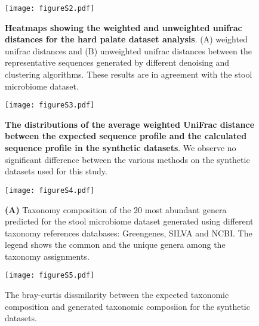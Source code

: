   \begin{figure}[h]
    \centering
    \texttt{[image: figureS2.pdf]}
    \caption{
      \textbf{Heatmaps showing the weighted and unweighted unifrac distances for the hard palate dataset analysis}.
      (A) weighted unifrac distances and (B) unweighted unifrac distances between the representative sequences generated by different denoising and clustering algorithms.
      These results are in agreement with the stool microbiome dataset.
    }
    \label{fig:figureS2}
  \end{figure}

  \begin{figure}[h]
    \centering
    \texttt{[image: figureS3.pdf]}
    \caption{
      \textbf{The distributions of the average weighted UniFrac distance between the expected sequence profile and the calculated sequence profile in the synthetic datasets}.
      We observe no significant difference between the various methods on the synthetic datasets used for this study.
    }
    \label{fig:figureS3}
  \end{figure}


  \begin{figure}[h]
    \centering
    \texttt{[image: figureS4.pdf]}
    \caption{
      \textbf{(A)} Taxonomy composition of the 20 most abundant genera predicted for the stool microbiome dataset generated using different taxonomy references databases: Greengenes, SILVA and NCBI.
      The legend shows the common and the unique genera among the taxonomy assignments.
  }
    \label{fig:figureS4}
  \end{figure}

  \begin{figure}[h]
    \centering
    \texttt{[image: figureS5.pdf]}
    \caption{
      The bray-curtis dissmilarity between the expected taxonomic composition and generated taxonomic composiion for the synthetic datasets.
  }
  \label{fig:figureS5}
  \end{figure}


